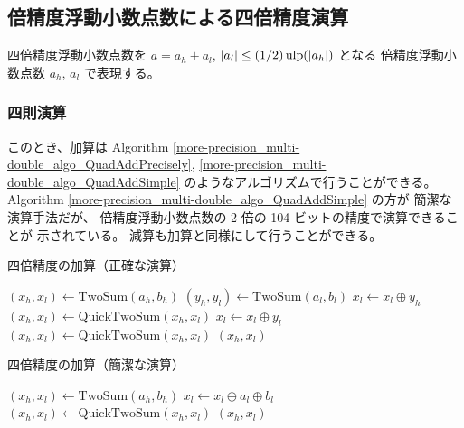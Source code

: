 \clearpage

\subsection{倍精度浮動小数点数による四倍精度演算}

四倍精度浮動小数点数を $a = a_h + a_l$, $|a_l| \le (1/2) \operatorname{ulp}(|a_h|)$ となる
倍精度浮動小数点数 $a_h$, $a_l$ で表現する。

\subsubsection{四則演算}

このとき、加算は
Algorithm \ref{more-precision_multi-double_algo_QuadAddPrecisely},
\ref{more-precision_multi-double_algo_QuadAddSimple}
のようなアルゴリズムで行うことができる。
Algorithm \ref{more-precision_multi-double_algo_QuadAddSimple} の方が
簡潔な演算手法だが、
倍精度浮動小数点数の 2 倍の 104 ビットの精度で演算できることが
示されている\cite{Naoya2012}。
減算も加算と同様にして行うことができる。

\begin{algorithm}[p]
    \caption{四倍精度の加算（正確な演算）\cite{Hisashi2006}}
    \label{more-precision_multi-double_algo_QuadAddPrecisely}
    \begin{algorithmic}
        \State $(x_h, x_l) \gets \text{TwoSum}(a_h, b_h)$
        \State $(y_h, y_l) \gets \text{TwoSum}(a_l, b_l)$
        \State $x_l \gets x_l \oplus y_h$
        \State $(x_h, x_l) \gets \text{QuickTwoSum}(x_h, x_l)$
        \State $x_l \gets x_l \oplus y_l$
        \State $(x_h, x_l) \gets \text{QuickTwoSum}(x_h, x_l)$
        \State \Return $(x_h, x_l)$
        \EndProcedure
    \end{algorithmic}
\end{algorithm}

\begin{algorithm}[p]
    \caption{四倍精度の加算（簡潔な演算）\cite{Naoya2012,Hirayama2014}}
    \label{more-precision_multi-double_algo_QuadAddSimple}
    \begin{algorithmic}
        \State $(x_h, x_l) \gets \text{TwoSum}(a_h, b_h)$
        \State $x_l \gets x_l \oplus a_l \oplus b_l$
        \State $(x_h, x_l) \gets \text{QuickTwoSum}(x_h, x_l)$
        \State \Return $(x_h, x_l)$
        \EndProcedure
    \end{algorithmic}
\end{algorithm}

